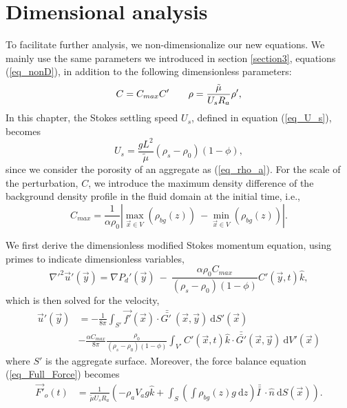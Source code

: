 \section{Dimensional analysis}
To facilitate further analysis, we non-dimensionalize our new equations. We mainly use the same parameters we introduced in section \ref{section3}, equations (\ref{eq_nonD}), in addition to the following dimensionless parameters:
\begin{equation}
	C= C_{max} C'
\hspace{7mm}
\rho = \frac{\tilde{\mu}  }{{U_s} R_a}  \rho', 
\end{equation}
In this chapter, the Stokes settling speed $U_s$, defined in equation (\ref{eq_U_s}), becomes
\[
U_s = \frac{g  L^2}{\tilde{\mu}}(\rho_s - \rho_0)(1-\phi),
\] 
since we consider the porosity of an aggregate as (\ref{eq_rho_a}).
For the scale of the perturbation, $C$, we introduce the maximum density difference of the background density profile in the fluid domain at the initial time, i.e., 
\begin{equation}
C_{max} = 
\frac{1}{\alpha \rho_0}
\left|
\max_{\vec{x}\in V} \left(\rho_{bg}(z)  \right)
\ - \min_{\vec{x} \in V} \left(\rho_{bg}(z)  \right) \right|.
\end{equation}
\par
We first derive the dimensionless modified Stokes momentum equation, using primes to indicate dimensionless variables,
\begin{equation}
	{\nabla'}^2  \vec{u}'(\vec{y})
	= \nabla {P_d}'(\vec{y}) \ - \  
	\frac{\alpha \rho_0  C_{max}}{(\rho_s - \rho_0)(1-\phi)}  C'\left(\vec{y},t \right)   \hat{k},
\label{eq_extra_C_nonD}
\end{equation}
which is then solved for the velocity,
 \begin{align}
		\vec{u}'(\vec{y})
			  & =- \frac{1}{8 \pi} \int_{S'}  
			 \vec{f'}(\vec{x}) 
			 \cdot \bar{\bar{G' \ }} (\vec{x},\vec{y}) 
			 \ \textrm{d}S'(\vec{x})
			 \nonumber \\
& -\frac{ \alpha C_{max}}{8\pi } \frac{\rho_0}{(\rho_s - \rho_0)(1-\phi)} 
\int_{V'} C' \left(\vec{x},  t \right) \hat{k} \cdot 
\bar{\bar{G'  }}(\vec{x}, \vec{y} ) 
\ \text{d}V'(\vec{x})
  \label{eq_vel_all_onS_nonD}
 \end{align}
where $S'$ is the aggregate surface. 
Moreover, the force balance equation (\ref{eq_Full_Force}) becomes
\begin{align}
	 \vec{F'}_o(t)
	 & =
	  \frac{1}{\tilde{\mu} U_s R_a} 
	  \left(
	-   \rho_a V_a g \hat{k}
	  +
	   \int_{S} \left( 
	   \int \rho_{bg}(z) g \ \textrm{d}z 
	   \right) \bar{\bar{I \ }}  \cdot
	  \hat{n} \ \textrm{d}S (\vec{x})
	\right).
\label{eq_Full_Force_nonD}
\end{align}

